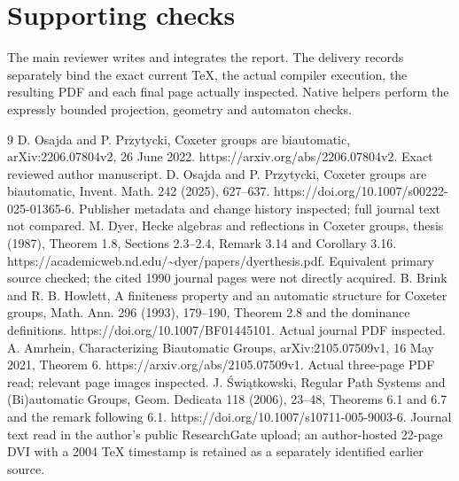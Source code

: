 \documentclass[10pt]{article}
\begin{document}
\section*{Supporting checks}
The main reviewer writes and integrates the report. The delivery records separately bind the exact current TeX, the actual compiler execution, the resulting PDF and each final page actually inspected. Native helpers perform the expressly bounded projection, geometry and automaton checks.\par
9 D. Osajda and P. Przytycki, Coxeter groups are biautomatic, arXiv:2206.07804v2, 26 June 2022. https://arxiv.org/abs/2206.07804v2. Exact reviewed author manuscript. D. Osajda and P. Przytycki, Coxeter groups are biautomatic, Invent. Math. 242 (2025), 627–637. https://doi.org/10.1007/s00222-025-01365-6. Publisher metadata and change history inspected; full journal text not compared. M. Dyer, Hecke algebras and reflections in Coxeter groups, thesis (1987), Theorem 1.8, Sections 2.3–2.4, Remark 3.14 and Corollary 3.16. https://academicweb.nd.edu/\textasciitilde{}dyer/papers/dyerthesis.pdf. Equivalent primary source checked; the cited 1990 journal pages were not directly acquired. B. Brink and R. B. Howlett, A finiteness property and an automatic structure for Coxeter groups, Math. Ann. 296 (1993), 179–190, Theorem 2.8 and the dominance definitions. https://doi.org/10.1007/BF01445101. Actual journal PDF inspected. A. Amrhein, Characterizing Biautomatic Groups, arXiv:2105.07509v1, 16 May 2021, Theorem 6. https://arxiv.org/abs/2105.07509v1. Actual three-page PDF read; relevant page images inspected. J. Świątkowski, Regular Path Systems and (Bi)automatic Groups, Geom. Dedicata 118 (2006), 23–48, Theorems 6.1 and 6.7 and the remark following 6.1. https://doi.org/10.1007/s10711-005-9003-6. Journal text read in the author’s public ResearchGate upload; an author-hosted 22-page DVI with a 2004 TeX timestamp is retained as a separately identified earlier source.\par
\end{document}
